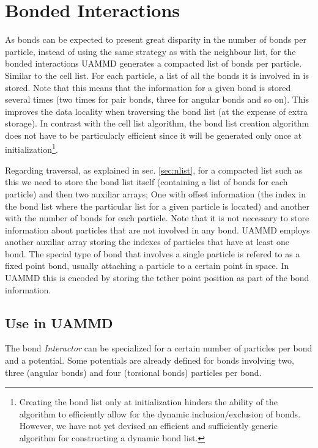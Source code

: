 \documentclass[ twoside,openright,titlepage,numbers=noenddot,%
headinclude,footinclude,cleardoublepage=empty,abstract=on,
BCOR=5mm,paper=a4,fontsize=11pt, dvipsnames
]{scrreprt}
\newcommand{\uammd}{\gls{UAMMD}\xspace}
\begin{document}
 \chapter{Bonded Interactions}\label{sec:bonded}

As bonds can be expected to present great disparity in the number of bonds per particle, instead of using the same strategy as with the neighbour list, for the bonded interactions \uammd generates a compacted list of bonds per particle. Similar to the cell list.
For each particle, a list of all the bonds it is involved in is stored. Note that this means that the information for a given bond is stored several times (two times for pair bonds, three for angular bonds and so on).
This improves the data locality when traversing the bond list (at the expense of extra storage).
In contrast with the cell list algorithm, the bond list creation algorithm does not have to be particularly efficient since it will be generated only once at initialization\footnote{Creating the bond list only at initialization hinders the ability of the algorithm to efficiently allow for the dynamic inclusion/exclusion of bonds. However, we have not yet devised an efficient and sufficiently generic algorithm for constructing a dynamic bond list.}.

Regarding traversal, as explained in sec. \ref{sec:nlist}, for a compacted list such as this we need to store the bond list itself (containing a list of bonds for each particle) and then two auxiliar arrays; One with offset information (the index in the bond list where the particular list for a given particle is located) and another with the number of bonds for each particle.
Note that it is not necessary to store information about particles that are not involved in any bond. UAMMD employs another auxiliar array storing the indexes of particles that have at least one bond.
The special type of bond that involves a single particle is refered to as a fixed point bond, usually attaching a particle to a certain point in space. In UAMMD this is encoded by storing the tether point position as part of the bond information.


\section*{Use in UAMMD}
The bond \emph{Interactor} can be specialized for a certain number of particles per bond and a potential. Some potentials are already defined for bonds involving two, three (angular bonds) and four (torsional bonds) particles per bond.
\end{document}
